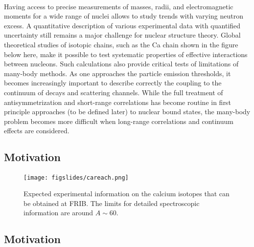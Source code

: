 \documentclass[%
twoside,                 %
final,                   %
10pt]{article}
\begin{document}
\paragraph{}
Having access to precise measurements of masses, radii, and
electromagnetic moments for a wide range of nuclei allows to study
trends with varying neutron excess. A quantitative description of
various experimental data with quantified uncertainty still remains a
major challenge for nuclear structure theory.  Global theoretical
studies of isotopic chains, such as the Ca chain shown in the figure below here, make it possible to test systematic
properties of effective interactions between nucleons. Such calculations also
provide critical tests of limitations of many-body methods. As one
approaches the particle emission thresholds, it becomes increasingly
important to describe correctly the coupling to the continuum of
decays and scattering channels. While the
full treatment of antisymmetrization and short-range correlations has
become routine in first principle  approaches (to be defined later) to nuclear bound states, the
many-body problem becomes more difficult when long-range correlations
and continuum effects are considered.



\subsection*{Motivation}

\paragraph{}


\begin{figure}[ht]
  \centerline{\texttt{[image: figslides/careach.png]}}
  \caption{
  Expected experimental information on the calcium isotopes that can be obtained at FRIB. The limits for detailed spectroscopic information are around $A\sim 60$.
  }
\end{figure}




\subsection*{Motivation}

\paragraph{}
\end{document}
